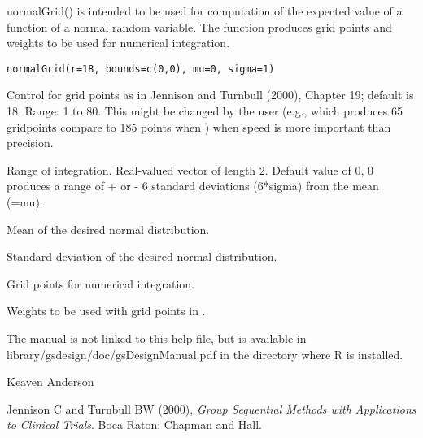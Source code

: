 \begin{Description}\relax
normalGrid() is intended to be used for computation of the expected value of 
a function of a normal random variable.
The function produces grid points and weights to be used for numerical integration.
\end{Description}
\begin{Usage}
\begin{verbatim}
normalGrid(r=18, bounds=c(0,0), mu=0, sigma=1)
\end{verbatim}
\end{Usage}
\begin{Arguments}
\begin{ldescription}
\item[\code{r}] Control for grid points as in Jennison and Turnbull (2000), Chapter 19; default is 18. Range: 1 to 80.
This might be changed by the user (e.g.,  which produces 65 gridpoints compare to 185 points when )
when speed is more important than precision.
\item[\code{bounds}] Range of integration. Real-valued vector of length 2. Default value of 0, 0 produces a range 
of + or - 6 standard deviations (6*sigma) from the mean (=mu).
\item[\code{mu}] Mean of the desired normal distribution.
\item[\code{sigma}] Standard deviation of the desired normal distribution.
\end{ldescription}
\end{Arguments}
\begin{Value}
\begin{ldescription}
\item[\code{z}] Grid points for numerical integration.
\item[\code{wgts}] Weights to be used with grid points in .
\end{ldescription}
\end{Value}
\begin{Note}\relax
The manual is not linked to this help file, but is available in library/gsdesign/doc/gsDesignManual.pdf
in the directory where R is installed.
\end{Note}
\begin{Author}\relax
Keaven Anderson 
\end{Author}
\begin{References}\relax
Jennison C and Turnbull BW (2000), \emph{Group Sequential Methods with Applications to Clinical Trials}.
Boca Raton: Chapman and Hall.
\end{References}
